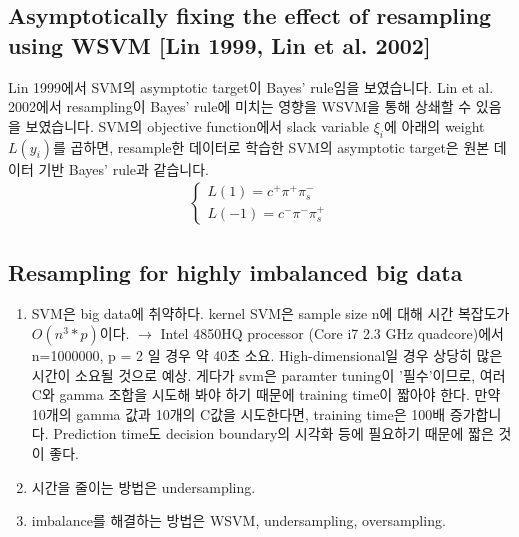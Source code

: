 \documentclass[11pt]{article}
\begin{document}
\subsection{Asymptotically fixing the effect of resampling using WSVM [Lin 1999, Lin et al. 2002]}
Lin 1999에서 SVM의 asymptotic target이 Bayes' rule임을 보였습니다. Lin et al. 2002에서 resampling이 Bayes' rule에 미치는 영향을 WSVM을 통해 상쇄할 수 있음을 보였습니다. SVM의 objective function에서 slack variable $\xi_i$에 아래의 weight $L(y_i)$를 곱하면, resample한 데이터로 학습한 SVM의 asymptotic target은 원본 데이터 기반 Bayes' rule과 같습니다.
\begin{align*}
	\begin{cases}
	L(1) = c^+ \pi^+ \pi_s^-\\ 
	L(-1) = c^- \pi^- \pi_s^+
	\end{cases}
\end{align*}

\subsection{Resampling for highly imbalanced big data}
\begin{enumerate}
	\item SVM은 big data에 취약하다. kernel SVM은 sample size n에 대해 시간 복잡도가 $O(n^3*p)$이다. $\to$ Intel 4850HQ processor (Core i7 2.3 GHz quadcore)에서 n=1000000, p = 2	일 경우 약 40초 소요. High-dimensional일 경우 상당히 많은 시간이 소요될 것으로 예상. 게다가 svm은 paramter tuning이 '필수'이므로, 여러 C와 gamma 조합을 시도해 봐야 하기 때문에 training time이 짧아야 한다. 만약 10개의 gamma 값과 10개의 C값을 시도한다면, training time은 100배 증가합니다. Prediction time도 decision boundary의 시각화 등에 필요하기 때문에 짧은 것이 좋다.
	\item 시간을 줄이는 방법은 undersampling.
	\item imbalance를 해결하는 방법은 WSVM, undersampling, oversampling.
\end{enumerate}
\end{document}
